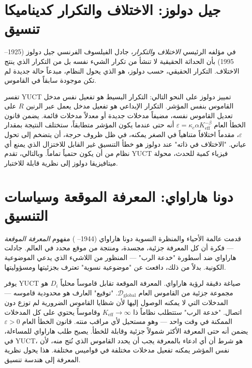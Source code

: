 \documentclass[12pt,a4paper]{article}
\begin{document}
	\section{جيل دولوز: الاختلاف والتكرار كديناميكا تنسيق}
	
	في مؤلفه الرئيسي \emph{الاختلاف والتكرار}، جادل الفيلسوف الفرنسي جيل دولوز (1925–1995) بأن الحداثة الحقيقية لا تنشأ من تكرار الشيء نفسه بل من التكرار الذي ينتج الاختلاف. التكرار الحقيقي، حسب دولوز، هو الذي يحول النظام، مبدعاً حالة جديدة لم تكن موجودة سابقاً في القاموس.
	
	تفسر YUCT تمييز دولوز على النحو التالي: التكرار البسيط هو تفعيل نفس مدخل القاموس بنفس المؤشر. التكرار الإبداعي هو تفعيل مدخل يعمل عبر الرنين \(R\) على تعديل القاموس نفسه، مضيفاً مدخلات جديدة أو معدلاً مدخلات قائمة. يضمن قانون الخطأ العام \(\varepsilon = \kappa_c \alpha K_{\mathrm{eff}}^{-\beta}\) أنه حتى عندما يكون المؤشر متطابقاً، ستختلف النتيجة بمقدار \(\varepsilon\)، مقدماً اختلافاً متناهياً في الصغر يمكنه، في ظل ظروف حرجة، أن يتضخم إلى تحول عياني. "الاختلاف في ذاته" عند دولوز هو خطأ التنسيق غير القابل للاختزال الذي يمنع أي نظام من أن يكون حتمياً تماماً. وبالتالي، تقدم YUCT فيزياء كمية للحدث، محولة ميتافيزيقا دولوز إلى نظرية قابلة للاختبار.
	
	\section{دونا هاراواي: المعرفة الموقعة وسياسات التنسيق}
	
	قدمت عالمة الأحياء والمنظرة النسوية دونا هاراواي (1944– ) مفهوم \emph{المعرفة الموقعة} — فكرة أن كل المعرفة جزئية، مجسدة، ومنتجة من موقع محدد في العالم. جادلت هاراواي ضد أسطورة "خدعة الرب" — المنظور من اللاشيء الذي يدعي الموضوعية الكونية. بدلاً من ذلك، دافعت عن "موضوعية نسوية" تعترف بجزئيتها ومسؤوليتها.
	
	يوفر YUCT صياغة دقيقة لرؤية هاراواي. المعرفة الموقعة تقابل قاموساً محلياً \(D_i\) هو مجموعة جزئية من القاموس العام \(\mathcal{D}_{\text{global}}\). "توقيع" العارف هو محدودية قاموسه — المدخلات التي لا يمكنه الوصول إليها لأن شظايا القاموس الضرورية لم توزع دون اتصال. "خدعة الرب" ستتطلب نظاماً ذا \(K_{\mathrm{eff}} \to \infty\) وقاموساً يحتوي على كل المدخلات الممكنة في وقت واحد — وهو مستحيل لأي مراقب منته. قانون الخطأ العام \(\varepsilon > 0\) يضمن أنه حتى المعرفة الأكثر شمولاً جزئية وقابلة للخطأ. يصبح طلب هاراواي للمساءلة، في YUCT، هو شرط أن أي ادعاء بالمعرفة يجب أن يحدد القاموس الذي نُتج منه، لأن نفس المؤشر يمكنه تفعيل مدخلات مختلفة في قواميس مختلفة. هذا يحول نظرية المعرفة إلى هندسة تنسيق.
	
\end{document}
